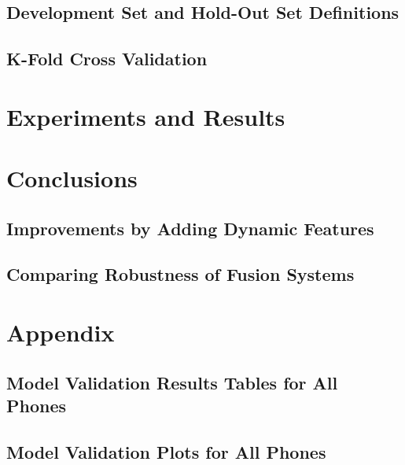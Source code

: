 \documentclass[11pt,a4paper]{tesis}
\begin{document}
	\section{Development Set and Hold-Out Set Definitions}
		
	\section{K-Fold Cross Validation}
		

\chapter{Experiments and Results}
	

\chapter{Conclusions}
	\section{Improvements by Adding Dynamic Features}
	\section{Comparing Robustness of Fusion Systems}

\chapter{Appendix}
	\begin{appendices}
		
		\section{Model Validation Results Tables for All Phones}
			
		\section{Model Validation Plots for All Phones}
			
	\end{appendices}

\printbibliography
\end{document}
